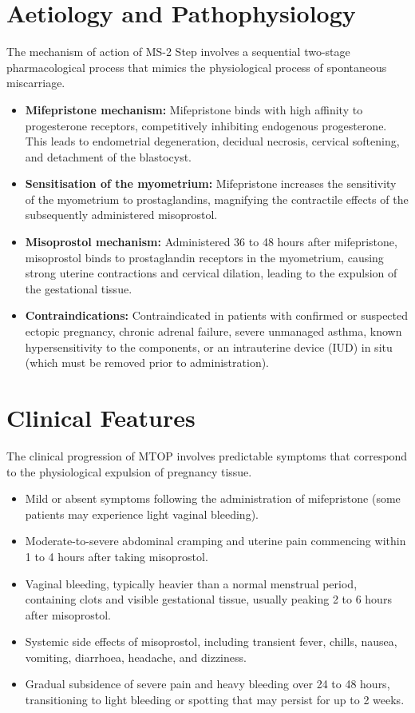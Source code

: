 \section*{Aetiology and Pathophysiology}
The mechanism of action of MS-2 Step involves a sequential two-stage pharmacological process that mimics the physiological process of spontaneous miscarriage.
\begin{itemize}
    \item \textbf{Mifepristone mechanism:} Mifepristone binds with high affinity to progesterone receptors, competitively inhibiting endogenous progesterone. This leads to endometrial degeneration, decidual necrosis, cervical softening, and detachment of the blastocyst.
    \item \textbf{Sensitisation of the myometrium:} Mifepristone increases the sensitivity of the myometrium to prostaglandins, magnifying the contractile effects of the subsequently administered misoprostol.
    \item \textbf{Misoprostol mechanism:} Administered 36 to 48 hours after mifepristone, misoprostol binds to prostaglandin receptors in the myometrium, causing strong uterine contractions and cervical dilation, leading to the expulsion of the gestational tissue.
    \item \textbf{Contraindications:} Contraindicated in patients with confirmed or suspected ectopic pregnancy, chronic adrenal failure, severe unmanaged asthma, known hypersensitivity to the components, or an intrauterine device (IUD) in situ (which must be removed prior to administration).
\end{itemize}

\section*{Clinical Features}
The clinical progression of MTOP involves predictable symptoms that correspond to the physiological expulsion of pregnancy tissue.
\begin{itemize}
    \item Mild or absent symptoms following the administration of mifepristone (some patients may experience light vaginal bleeding).
    \item Moderate-to-severe abdominal cramping and uterine pain commencing within 1 to 4 hours after taking misoprostol.
    \item Vaginal bleeding, typically heavier than a normal menstrual period, containing clots and visible gestational tissue, usually peaking 2 to 6 hours after misoprostol.
    \item Systemic side effects of misoprostol, including transient fever, chills, nausea, vomiting, diarrhoea, headache, and dizziness.
    \item Gradual subsidence of severe pain and heavy bleeding over 24 to 48 hours, transitioning to light bleeding or spotting that may persist for up to 2 weeks.
\end{itemize}


